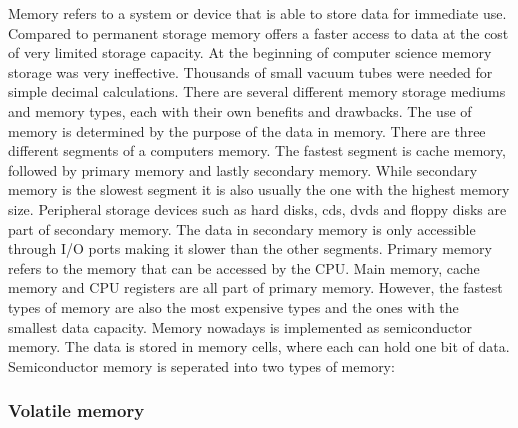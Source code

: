 Memory refers to a system or device that is able to store data for immediate use. Compared to permanent 
storage memory offers a faster access to data at the cost of very limited storage capacity. At the 
beginning of computer science memory storage was very ineffective. Thousands of small vacuum tubes 
were needed for simple decimal calculations. There are several different memory storage mediums and memory 
types, each with their own benefits and drawbacks. The use of memory is determined by the purpose of
the data in memory. There are three different segments of a computers memory. The fastest segment is cache
memory, followed by primary memory and lastly secondary memory. While secondary memory is the slowest segment it is
also usually the one with the highest memory size. Peripheral storage devices such as hard disks, cds, dvds and floppy disks
are part of secondary memory. The data in secondary memory is only accessible through I/O ports making 
it slower than the other segments. Primary memory refers to the memory that can be accessed by the CPU. Main memory, 
cache memory and CPU registers are all part of primary memory. However, the fastest types of memory 
are also the most expensive types and the ones with the smallest data capacity. Memory nowadays is 
implemented as semiconductor memory. The data is stored in memory cells, where each can hold one bit 
of data. Semiconductor memory is seperated into two types of memory:

\subsubsection{Volatile memory}

